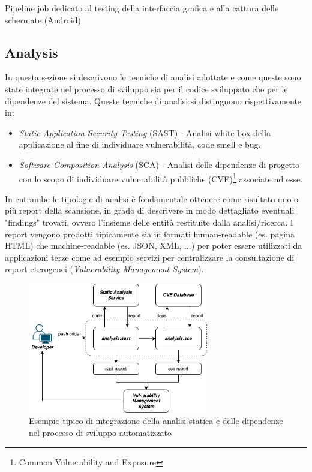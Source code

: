 \begin{listing}[H]
\inputminted{yaml}{code/4-screenshot-ui-android}
\caption{Pipeline job dedicato al testing della interfaccia grafica e alla cattura delle schermate (Android)}
\end{listing}


\subsection{Analysis}
In questa sezione si descrivono le tecniche di analisi adottate e come queste sono state integrate nel processo di sviluppo sia per il codice sviluppato che per le dipendenze del sistema. Queste tecniche di analisi si distinguono rispettivamente in:
\begin{itemize}
    \item \textit{Static Application Security Testing} (SAST) - Analisi white-box della applicazione al fine di individuare vulnerabilità, code smell e bug.
    \item \textit{Software Composition Analysis} (SCA) - Analisi delle dipendenze di progetto con lo scopo di individuare vulnerabilità pubbliche (CVE)\footnote{Common Vulnerability and Exposure} associate ad esse.
\end{itemize}
In entrambe le tipologie di analisi è fondamentale ottenere come risultato uno o più report della scansione, in grado di descrivere in modo dettagliato eventuali "findings" trovati, ovvero l'insieme delle entità restituite dalla analisi/ricerca. I report vengono prodotti tipicamente sia in formati human-readable (es. pagina HTML) che machine-readable (es. JSON, XML, ...) per poter essere utilizzati da applicazioni terze come ad esempio servizi per centralizzare la consultazione di report eterogenei (\textit{Vulnerability Management System}).

\begin{figure}[H]
\centering
\includegraphics[width=0.7\textwidth]{img/tesi-12-sastsca.drawio.png}
\caption{Esempio tipico di integrazione della analisi statica e delle dipendenze nel processo di sviluppo automatizzato}
\end{figure}

